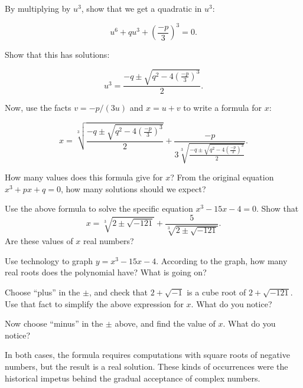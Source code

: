 \documentclass[nooutcomes]{ximera}
\begin{document}
By multiplying by $u^3$, show that we get a quadratic in $u^3$:   

$$u^6+qu^3+\left( \frac{-p}{3}\right)^3 = 0.$$

Show that this has solutions: 

$$u^3 = \frac{-q\pm\sqrt{q^2-4\left( \frac{-p}{3}\right)^3}}{2}.$$

Now, use the facts $v= -p/(3u)$ and $x = u + v$ to write a formula for $x$: 

$$x = \sqrt[3]{\frac{-q\pm\sqrt{q^2-4\left( \frac{-p}{3}\right)^3}}{2}} 
+  \frac{-p}{3\sqrt[3]{\frac{-q\pm\sqrt{q^2-4\left( \frac{-p}{3}\right)^3}}{2}}}.$$

\begin{problem}
How many values does this formula give for $x$?  From the original equation $x^3+px+q=0$, how many solutions should we expect? 
\end{problem}
\vfill

\begin{problem}
Use the above formula to solve the specific equation $x^3-15x-4=0$.  Show that $$x = \sqrt[3]{2 \pm \sqrt{-121}} + \frac{5}{\sqrt[3]{2\pm\sqrt{-121}}}.$$
Are these values of $x$ real numbers?  
\end{problem}
\vfill


\begin{problem}
Use technology to graph $y=x^3-15x-4$.  According to the graph, how many real roots does the polynomial have?  What is going on?  
\end{problem}
\vfill

\begin{problem}
Choose ``plus'' in the $\pm$, and check that $2+\sqrt{-1}$ is a cube root of $2 + \sqrt{-121}$.  Use that fact to simplify the above expression for $x$.  What do you notice?  
\end{problem}
\vfill

\begin{problem}
Now choose ``minus'' in the $\pm$ above, and find the value of $x$.  What do you notice?  
\end{problem}

\vfill
In both cases, the formula requires computations with square roots of negative numbers, but the result is a real solution.  These kinds of occurrences were the historical impetus behind the gradual acceptance of complex numbers.  
\end{document}

